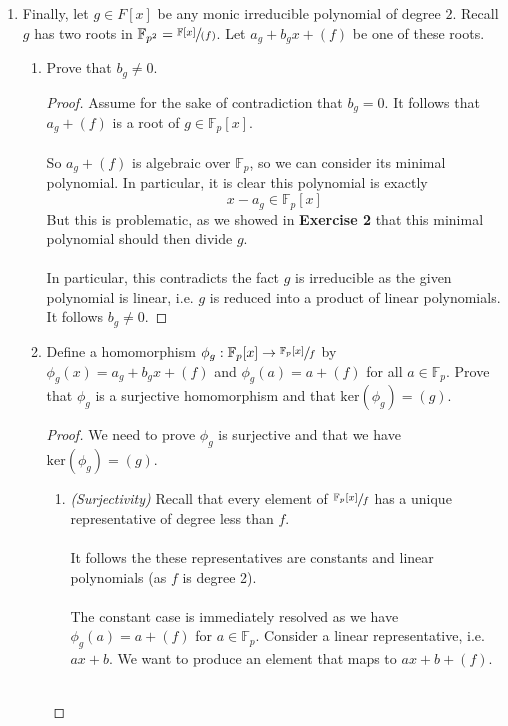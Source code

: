 \documentclass[12pt]{article}
\newenvironment{ex}[2][Exercise]{\begin{trivlist}
\item[\hskip \labelsep {\bfseries #1}\hskip \labelsep {\bfseries #2.}]}{\end{trivlist}}
\begin{document}
\begin{ex}{4}
\begin{enumerate}[label=(\alph*)]
\begin{proof}
        \end{proof}
        \item Finally, let $g \in F[x]$ be any monic irreducible polynomial of degree $2$. Recall $g$ has two roots in $\mathbb{F}_{p^2} = \sfrac{\mathbb{F}[x]}{(f)}$. Let $a_g + b_gx + (f)$ be one of these roots.
        \begin{enumerate}[label=(\roman*)]
            \item Prove that $b_g \neq 0$.
            \begin{proof}
                Assume for the sake of contradiction that $b_g = 0$. It follows that $a_g + (f)$ is a root of $g \in \mathbb{F}_p[x]$. \\ \\
                So $a_g + (f)$ is algebraic over $\mathbb{F}_p$, so we can consider its minimal polynomial. In particular, it is clear this polynomial is exactly 
                $$x - a_g \in \mathbb{F}_p[x]$$
                But this is problematic, as we showed in \textbf{Exercise 2} that this minimal polynomial should then divide $g$. \\ \\In particular, this contradicts the fact $g$ is irreducible as the given polynomial is linear, i.e. $g$ is reduced into a product of linear polynomials. It follows $b_g \neq 0$. 
            \end{proof}
            \item Define a homomorphism $\phi_g : \mathbb{F}_p[x] \rightarrow \sfrac{\mathbb{F}_p[x]}{f}$ by $\phi_g(x) = a_g + b_gx + (f)$ and $\phi_g(a) = a + (f)$ for all $a \in \mathbb{F}_p$. Prove that $\phi_g$ is a surjective homomorphism and that $\text{ker}(\phi_g) = (g)$. 
            \begin{proof}
                We need to prove $\phi_g$ is surjective and that we have $\text{ker}(\phi_g) = (g)$. 
                \begin{enumerate}[label=(\arabic*)]
                    \item \textit{(Surjectivity)} Recall that every element of $\sfrac{\mathbb{F}_p[x]}{f}$ has a unique representative of degree less than $f$. \\ \\ It follows the these representatives are constants and linear polynomials (as $f$ is degree 2). \\ \\ 
                    The constant case is immediately resolved as we have $\phi_g(a) = a + (f)$ for $a \in \mathbb{F}_p$. Consider a linear representative, i.e. $ax + b$. We want to produce an element that maps to $ax + b + (f)$. \\ \\

\end{enumerate}
\end{proof}
\end{enumerate}
\end{enumerate}
\end{ex}
\end{document}
